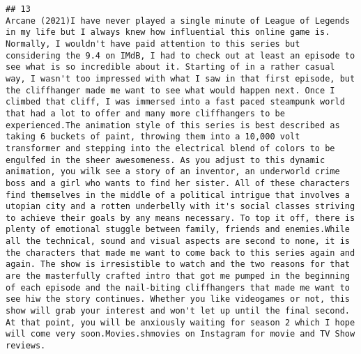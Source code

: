 \documentclass[
]{article}
\begin{document}
\begin{verbatim}
## 13                                                                                                                                                                                                                                                                                                                                                                                                                                                                                                                                                                                                                                                                                                                                                                                                                                                                                                                                                                                                                                                                  Arcane (2021)I have never played a single minute of League of Legends in my life but I always knew how influential this online game is. Normally, I wouldn't have paid attention to this series but considering the 9.4 on IMdB, I had to check out at least an episode to see what is so incredible about it. Starting of in a rather casual way, I wasn't too impressed with what I saw in that first episode, but the cliffhanger made me want to see what would happen next. Once I climbed that cliff, I was immersed into a fast paced steampunk world that had a lot to offer and many more cliffhangers to be experienced.The animation style of this series is best described as taking 6 buckets of paint, throwing them into a 10,000 volt transformer and stepping into the electrical blend of colors to be engulfed in the sheer awesomeness. As you adjust to this dynamic animation, you wilk see a story of an inventor, an underworld crime boss and a girl who wants to find her sister. All of these characters find themselves in the middle of a political intrigue that involves a utopian city and a rotten underbelly with it's social classes striving to achieve their goals by any means necessary. To top it off, there is plenty of emotional stuggle between family, friends and enemies.While all the technical, sound and visual aspects are second to none, it is the characters that made me want to come back to this series again and again. The show is irresistible to watch and the two reasons for that are the masterfully crafted intro that got me pumped in the beginning of each episode and the nail-biting cliffhangers that made me want to see hiw the story continues. Whether you like videogames or not, this show will grab your interest and won't let up until the final second. At that point, you will be anxiously waiting for season 2 which I hope will come very soon.Movies.shmovies on Instagram for movie and TV Show reviews.

\end{verbatim}
\end{document}
